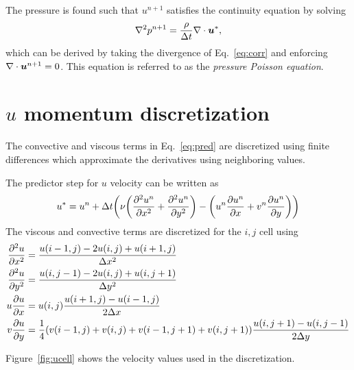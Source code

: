 \documentclass[]{article}
\def\bm#1{\mbox{\boldmath{$#1$}}}
\let\originalleft\left
\let\originalright\right
\renewcommand{\left}{\mathopen{}\mathclose\bgroup\originalleft}
\renewcommand{\right}{\aftergroup\egroup\originalright}
\begin{document}
The pressure is found such that $u^{n+1}$ satisfies the continuity equation by solving
\begin{equation}\label{eq:Poisson}
  \nabla^2p^{n+1}=\frac{\rho}{\Delta t} \nabla\cdot\bm{u}^*,
\end{equation}
which can be derived by taking the divergence of Eq.~\ref{eq:corr} and enforcing $\nabla\cdot\bm{u}^{n+1}=0$.  This equation is referred to as the \emph{pressure Poisson equation}.


\section{$u$ momentum discretization}\label{sec:u}

The convective and viscous terms in Eq.~\ref{eq:pred} are discretized using finite differences which approximate the derivatives using neighboring values.


The predictor step for $u$ velocity can be written as
\begin{equation}
  u^*=u^n+\Delta t\left(\nu\left(\frac{\partial^2u^n}{\partial x^2}+\frac{\partial^2u^n}{\partial y^2}\right) 
  -\left(u^n\frac{\partial u^n}{\partial x}+v^n\frac{\partial u^n}{\partial y}\right)\right)
\end{equation}
The viscous and convective terms are discretized for the $i,j$ cell using
\begin{align}
  \frac{\partial^2 u}{\partial x^2} &= \frac{u(i-1,j)-2u(i,j)+u(i+1,j)}{\Delta x^2} \\
  \frac{\partial^2 u}{\partial y^2} &= \frac{u(i,j-1)-2u(i,j)+u(i,j+1)}{\Delta y^2} \\
  u\frac{\partial u}{\partial x} &= u(i,j)\frac{u(i+1,j)-u(i-1,j)}{2\Delta x}\\
  v\frac{\partial u}{\partial y} &= \frac{1}{4}\left(v(i-1,j)+v(i,j)+v(i-1,j+1)+v(i,j+1)\right)\frac{u(i,j+1)-u(i,j-1)}{2\Delta y}
\end{align}

Figure~\ref{fig:ucell} shows the velocity values used in the discretization.
\end{document}
